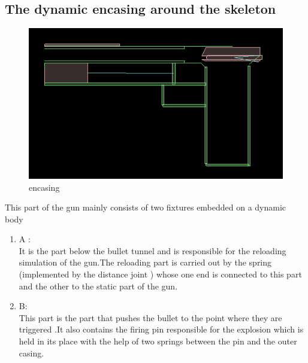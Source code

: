 \documentclass[11pt]{article}
\begin{document}
\subsection{The dynamic encasing around the skeleton}
\begin{figure}[here]
\begin{center}
\includegraphics[scale=0.3]{../details/images/stick.png}
\caption{encasing}
\end{center}
\end{figure}
This part of the gun mainly consists of two fixtures \cite{box2d}
embedded on a dynamic body  \cite{box2d}
\begin{enumerate}
\item A : \\
It is the part below the bullet tunnel and is responsible for the reloading simulation of the gun.The reloading part is carried out by the spring (implemented by the distance joint \cite{box2d}
) whose one end is connected to this part and the other to the static part of the gun.
\item B: \\
This part is the part that pushes the bullet to the point where they are triggered .It also contains the firing pin responsible for the explosion which is held in its place with the help of two springs between the pin and the outer casing.
\end{enumerate}
\end{document}
